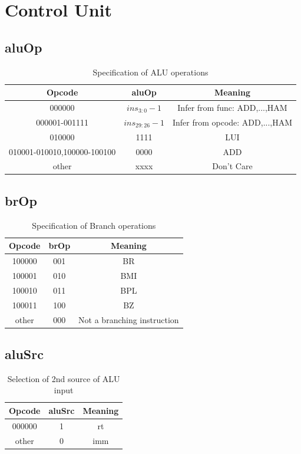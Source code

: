 \documentclass{article}
\begin{document}
\section{Control Unit}

\subsection{aluOp}
\begin{table}[H]
    \centering
    \begin{tabular}{|c|c|c|}
        \hline
        \textbf{Opcode} & \textbf{aluOp} & \textbf{Meaning} \\
        \hline
        000000 & $ins_{3:0}-1$ & Infer from func: ADD,...,HAM \\
        000001-001111 & $ins_{29:26}-1$ & Infer from opcode: ADD,...,HAM \\
        010000 & 1111 & LUI \\
        010001-010010,100000-100100 & 0000 & ADD \\
        other & xxxx & Don't Care \\
        \hline
    \end{tabular}
    \caption{Specification of ALU operations}
\end{table}

\subsection{brOp}
\begin{table}[H]
    \centering
    \begin{tabular}{|c|c|c|}
        \hline
        \textbf{Opcode} & \textbf{brOp} & \textbf{Meaning} \\
        \hline
        100000 & 001 & BR \\
        100001 & 010 & BMI \\
        100010 & 011 & BPL \\
        100011 & 100 & BZ \\
        other & 000 & Not a branching instruction \\
        \hline
    \end{tabular}
    \caption{Specification of Branch operations}
\end{table}

\subsection{aluSrc}
\begin{table}[H]
    \centering
    \begin{tabular}{|c|c|c|}
        \hline
        \textbf{Opcode} & \textbf{aluSrc} & \textbf{Meaning} \\
        \hline
        000000 & 1 & rt \\
        other & 0 & imm \\
        \hline
    \end{tabular}
    \caption{Selection of 2nd source of ALU input}
\end{table}
\end{document}
